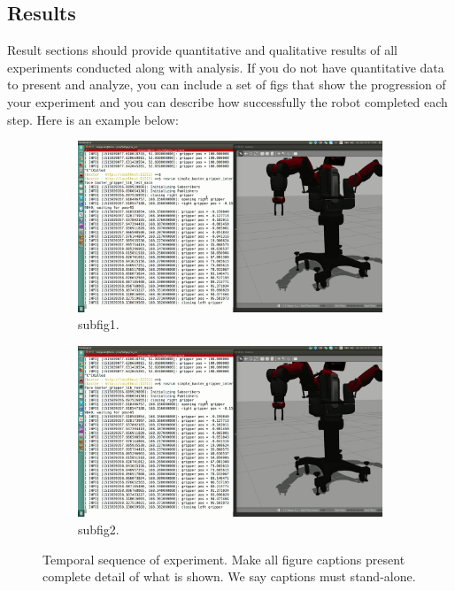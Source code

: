\documentclass[conference]{IEEEtran}
\begin{document}
\subsection{Results}
Result sections should provide quantitative and qualitative results of all experiments conducted along with analysis. If you do not have quantitative data to present and analyze, you can include a set of figs that show the progression of your experiment and you can describe how successfully the robot completed each step. Here is an example below:
\begin{figure}[htb]
     \centering
     \begin{subfigure}{0.4\textwidth}
         \centering
         \includegraphics[width=\textwidth]{pics/baxter.png}
         \caption{subfig1.}
         \label{fig:rob_traj_reflection}
     \end{subfigure}
     \hspace{0.5cm}
     \begin{subfigure}{0.4\textwidth}
         \centering
         \includegraphics[width=\textwidth]{pics/baxter.png}
         \caption{subfig2.}
         \label{fig:trajectory_reflection}
     \end{subfigure}
     \caption{Temporal sequence of experiment. Make all figure captions present complete detail of what is shown. We say captions must stand-alone. }
     \label{fig:iter}
\end{figure}
\end{document}
